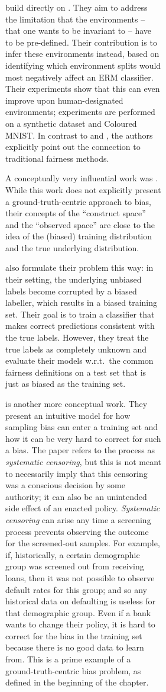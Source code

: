 \begin{figure}[tp]
\begin{subfigure}[b]{0.4\textwidth}
\begin{subfigure}[b]{0.4\textwidth}
\citet{creager2020environment} build directly on \citet{arjovsky2019invariant}. They aim to address
the limitation that the environments -- that one wants to be invariant to -- have to be
pre-defined. Their contribution is to infer these environments instead, based on identifying which
environment splits would most negatively affect an \ac{ERM} classifier. Their experiments show that
this can even improve upon human-designated environments; experiments are performed on a synthetic
dataset and Coloured MNIST. In contrast to \citet{kim2019learning} and
\citet{arjovsky2019invariant}, the authors explicitly point out the connection to traditional
fairness methods.

A conceptually very influential work was \citet{friedler2016possibility}. While this work does not
explicitly present a ground-truth-centric approach to bias, their concepts of the ``construct
space'' and the ``observed space'' are close to the idea of the (biased) training distribution and
the true underlying distribution.

\citet{jiang2020identifying} also formulate their problem this way: in their setting, the
underlying unbiased labels become corrupted by a biased labeller, which results in a biased
training set. Their goal is to train a classifier that makes correct predictions consistent with
the true labels. However, they treat the true labels as completely unknown and evaluate their
models w.r.t.\ the common fairness definitions on a test set that is just as biased as the training
set.

\citet{kallus2018residual} is another more conceptual work. They present an intuitive model for how
sampling bias can enter a training set and how it can be very hard to correct for such a bias. The
paper refers to the process as \emph{systematic censoring}, but this is not meant to necessarily
imply that this censoring was a conscious decision by some authority; it can also be an unintended
side effect of an enacted policy. \emph{Systematic censoring} can arise any time a screening
process prevents observing the outcome for the screened-out samples. For example, if, historically,
a certain demographic group was screened out from receiving loans, then it was not possible to
observe default rates for this group; and so any historical data on defaulting is useless for that
demographic group. Even if a bank wants to change their policy, it is hard to correct for the bias
in the training set because there is no good data to learn from. This is a prime example of a
ground-truth-centric bias problem, as defined in the beginning of the chapter.


\end{subfigure}
\end{subfigure}
\end{figure}
